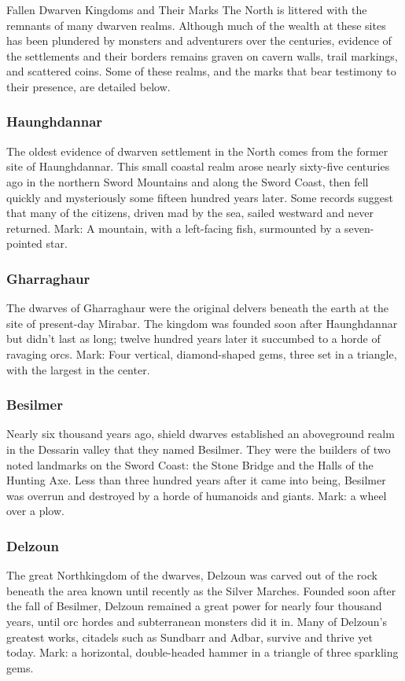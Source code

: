 \documentclass[10pt,a4paper,twoside,twocolumn,openany,bg=print,nodeprecatedcode]{dndbook}
\begin{document}
\begin{DndComment}{Fallen Dwarven Kingdoms and Their Marks}
The North is littered with the remnants of many dwarven realms. Although much of the wealth at these sites has been plundered by monsters and adventurers over the centuries, evidence of the settlements and their borders remains graven on cavern walls, trail markings, and scattered coins. Some of these realms, and the marks that bear testimony to their presence, are detailed below.
\subsubsection{Haunghdannar}
The oldest evidence of dwarven settlement in the North comes from the former site of Haunghdannar. This small coastal realm arose nearly sixty-five centuries ago in the northern Sword Mountains and along the Sword Coast, then fell quickly and mysteriously some fifteen hundred years later. Some records suggest that many of the citizens, driven mad by the sea, sailed westward and never returned. Mark: A mountain, with a left-facing fish, surmounted by a seven-pointed star.
\subsubsection{Gharraghaur}
The dwarves of Gharraghaur were the original delvers beneath the earth at the site of present-day Mirabar. The kingdom was founded soon after Haunghdannar but didn't last as long; twelve hundred years later it succumbed to a horde of ravaging orcs. Mark: Four vertical, diamond-shaped gems, three set in a triangle, with the largest in the center.
\subsubsection{Besilmer}
Nearly six thousand years ago, shield dwarves established an aboveground realm in the Dessarin valley that they named Besilmer. They were the builders of two noted landmarks on the Sword Coast: the Stone Bridge and the Halls of the Hunting Axe. Less than three hundred years after it came into being, Besilmer was overrun and destroyed by a horde of humanoids and giants. Mark: a wheel over a plow.
\subsubsection{Delzoun}
The great Northkingdom of the dwarves, Delzoun was carved out of the rock beneath the area known until recently as the Silver Marches. Founded soon after the fall of Besilmer, Delzoun remained a great power for nearly four thousand years, until orc hordes and subterranean monsters did it in. Many of Delzoun's greatest works, citadels such as Sundbarr and Adbar, survive and thrive yet today. Mark: a horizontal, double-headed hammer in a triangle of three sparkling gems.
\end{DndComment}
\end{document}
